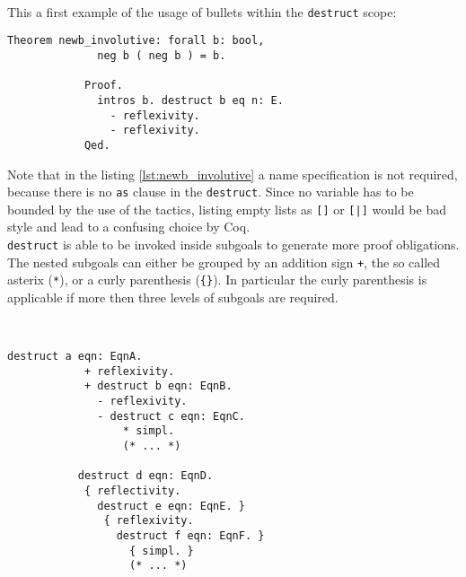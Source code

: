 		\begin{example}  
		~\\\vspace{-5mm} 
		This a first example of the usage of bullets within the \lstinline!destruct! scope:
		{\normalfont
		  \begin{lstlisting}[caption=\lstinline!newb_involutive!, label=lst:newb_involutive]
		  	Theorem newb_involutive: forall b: bool,
		  	  neg b ( neg b ) = b.
		  	  
		  	Proof. 
		  	  intros b. destruct b eq n: E.
		  	    - reflexivity. 
		  	    - reflexivity. 
		  	Qed.  	   
		  \end{lstlisting}}
		\end{example}	 
		 Note that in the listing \ref{lst:newb_involutive} a name specification is not required, because there is no \lstinline!as! clause in the \lstinline!destruct!.
		 Since no variable has to be bounded by the use of the tactics, listing empty lists as \lstinline![]! or \lstinline![|]! would be bad style and lead to a confusing choice by Coq.\\	 
		 \lstinline!destruct! is able to be invoked inside subgoals to generate more proof obligations.
		  The nested subgoals can either be grouped by an addition sign \lstinline!+!, the so called asterix (\lstinline!*!), or a curly parenthesis (\lstinline!{}!). 
		  In particular the curly parenthesis is applicable if more then three levels of subgoals are required. 
		  \begin{example}%
		   ~\\\vspace{-10mm}
		  {\normalfont 
		  \begin{lstlisting}[caption = syntax of nested \lstinline!destruct! expressions]
		  destruct a eqn: EqnA.
		    + reflexivity.
		    + destruct b eqn: EqnB.
		      - reflexivity.
		      - destruct c eqn: EqnC.
		          * simpl. 
		          (* ... *)       
		  
		   destruct d eqn: EqnD.
		    { reflectivity.
		      destruct e eqn: EqnE. } 
		       { reflexivity.
		         destruct f eqn: EqnF. } 
		           { simpl. }
		           (* ... *)   
		   \end{lstlisting}}
		   \end{example}
		   	 
